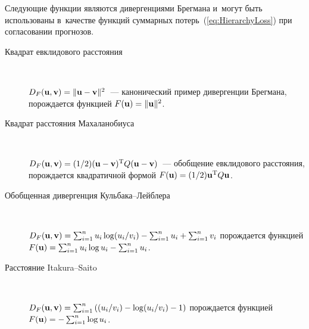 \begin{multicols}{2}
Следующие функции являются дивергенциями Брегмана и~могут быть
использованы в~качестве функций суммарных потерь~(\ref{eq:HierarchyLoss}) при согласовании прогнозов.
\begin{description}
    \item[Квадрат евклидового расстояния] \

    $D_F(\uu, \mathbf{v}) \hm= \| \uu\hm -
    \mathbf{v} \|^2$~--- канонический пример дивергенции Брегмана, порождается
    функцией $F(\uu) \hm= \| \uu \|^2$.
    \item[Квадрат расстояния Махаланобиуса]\

    $D_F(\uu, \mathbf{v})\hm = (1/2)(\uu - \mathbf{v})^{\mathrm{T}} Q (\uu \hm-
    \mathbf{v})$~--- обобщение евклидового расстояния, порождается
    квадратичной формой $F(\uu) \hm= (1/2) \uu^{\mathrm{T}} Q \uu$.
    \item[Обобщенная дивергенция Куль\-ба\-ка--Лейб\-ле\-ра]\

    $D_F(\uu, \mathbf{v}) \hm=
    \sum\nolimits_{i = 1}^n u_i \log ({u_i}/{v_i})
 \hm   - \sum\nolimits_{i = 1}^n u_i\hm + \sum\nolimits_{i = 1}^n v_i$
 по\-рож\-да\-ет\-ся     функцией
 $F(\uu) \hm= \sum\nolimits_{i = 1}^n u_i \log u_i \hm-
    \sum\nolimits_{i = 1}^n
    u_i$.
    \item[Расстояние  Itakura--Saito]\

    $D_F(\uu, \mathbf{v}) = \sum\nolimits_{i = 1}^n \left(
    (u_i/v_i) \hm- \log ({u_i}/{v_i}) \hm- 1    \right)$ порождается функцией
    $F(\uu)\hm = - \sum\nolimits_{i = 1}^n \log
    u_i$.
\end{description}


\end{multicols}
